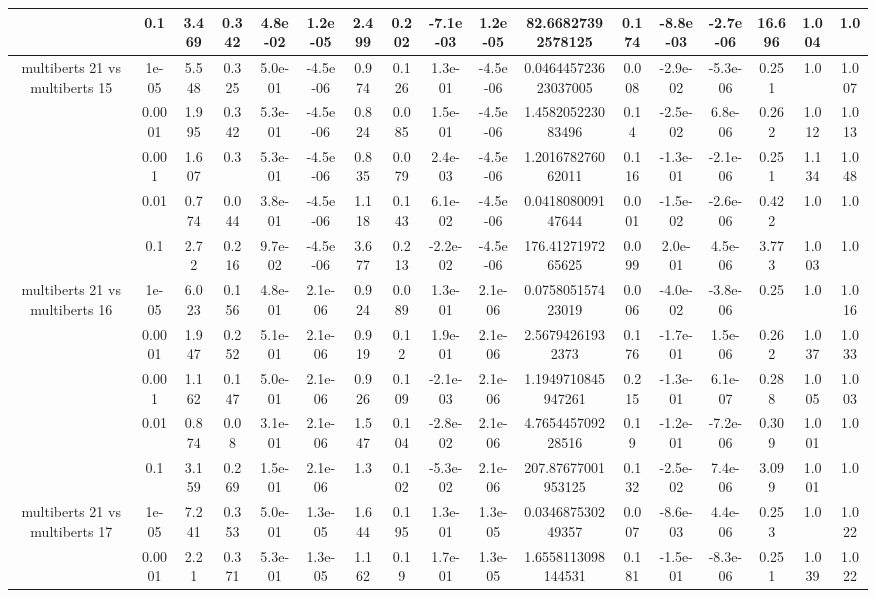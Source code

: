 \begin{tabular}{|c|c|c|c|c|c|c|c|c|c|c|c|c|c|c|c|c|}
 & 0.1 & 3.469 & 0.342 & 4.8e-02 & 1.2e-05 & 2.499 & 0.202 & -7.1e-03 & 1.2e-05 & 82.66827392578125 & 0.174 & -8.8e-03 & -2.7e-06 & 16.696 & 1.004 & 1.0 \\
\hline
\multirow{5}{*}{multiberts 21 vs multiberts 15} & 1e-05 & 5.548 & 0.325 & 5.0e-01 & -4.5e-06 & 0.974 & 0.126 & 1.3e-01 & -4.5e-06 & 0.046445723623037005 & 0.008 & -2.9e-02 & -5.3e-06 & 0.251 & 1.0 & 1.007 \\
 & 0.0001 & 1.995 & 0.342 & 5.3e-01 & -4.5e-06 & 0.824 & 0.085 & 1.5e-01 & -4.5e-06 & 1.458205223083496 & 0.14 & -2.5e-02 & 6.8e-06 & 0.262 & 1.012 & 1.013 \\
 & 0.001 & 1.607 & 0.3 & 5.3e-01 & -4.5e-06 & 0.835 & 0.079 & 2.4e-03 & -4.5e-06 & 1.201678276062011 & 0.116 & -1.3e-01 & -2.1e-06 & 0.251 & 1.134 & 1.048 \\
 & 0.01 & 0.774 & 0.044 & 3.8e-01 & -4.5e-06 & 1.118 & 0.143 & 6.1e-02 & -4.5e-06 & 0.041808009147644 & 0.001 & -1.5e-02 & -2.6e-06 & 0.422 & 1.0 & 1.0 \\
 & 0.1 & 2.72 & 0.216 & 9.7e-02 & -4.5e-06 & 3.677 & 0.213 & -2.2e-02 & -4.5e-06 & 176.4127197265625 & 0.099 & 2.0e-01 & 4.5e-06 & 3.773 & 1.003 & 1.0 \\
\hline
\multirow{5}{*}{multiberts 21 vs multiberts 16} & 1e-05 & 6.023 & 0.156 & 4.8e-01 & 2.1e-06 & 0.924 & 0.089 & 1.3e-01 & 2.1e-06 & 0.075805157423019 & 0.006 & -4.0e-02 & -3.8e-06 & 0.25 & 1.0 & 1.016 \\
 & 0.0001 & 1.947 & 0.252 & 5.1e-01 & 2.1e-06 & 0.919 & 0.12 & 1.9e-01 & 2.1e-06 & 2.56794261932373 & 0.176 & -1.7e-01 & 1.5e-06 & 0.262 & 1.037 & 1.033 \\
 & 0.001 & 1.162 & 0.147 & 5.0e-01 & 2.1e-06 & 0.926 & 0.109 & -2.1e-03 & 2.1e-06 & 1.1949710845947261 & 0.215 & -1.3e-01 & 6.1e-07 & 0.288 & 1.005 & 1.003 \\
 & 0.01 & 0.874 & 0.08 & 3.1e-01 & 2.1e-06 & 1.547 & 0.104 & -2.8e-02 & 2.1e-06 & 4.765445709228516 & 0.19 & -1.2e-01 & -7.2e-06 & 0.309 & 1.001 & 1.0 \\
 & 0.1 & 3.159 & 0.269 & 1.5e-01 & 2.1e-06 & 1.3 & 0.102 & -5.3e-02 & 2.1e-06 & 207.87677001953125 & 0.132 & -2.5e-02 & 7.4e-06 & 3.099 & 1.001 & 1.0 \\
\hline
\multirow{5}{*}{multiberts 21 vs multiberts 17} & 1e-05 & 7.241 & 0.353 & 5.0e-01 & 1.3e-05 & 1.644 & 0.195 & 1.3e-01 & 1.3e-05 & 0.034687530249357 & 0.007 & -8.6e-03 & 4.4e-06 & 0.253 & 1.0 & 1.022 \\
 & 0.0001 & 2.21 & 0.371 & 5.3e-01 & 1.3e-05 & 1.162 & 0.19 & 1.7e-01 & 1.3e-05 & 1.6558113098144531 & 0.181 & -1.5e-01 & -8.3e-06 & 0.251 & 1.039 & 1.022 \\

\end{tabular}
